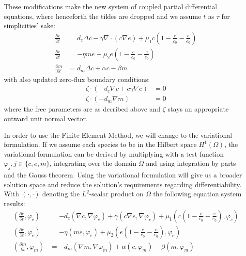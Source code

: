 These modifications make the new system of coupled partial differential equations, where henceforth the tildes are dropped and we assume $t$ as $\tau$ for simplicities' sake:
\begin{align}
	\frac{\partial c}{\partial t} &= d_c \Delta c - \gamma \nabla \cdot (c\nabla e)  + \mu_1 c\left(1-\frac{c}{c_0}-\frac{e}{e_0}\right)\label{eq:6}\\
	\frac{\partial e}{\partial t} &= -\eta m e  + \mu_2 e\left(1-\frac{c}{c_0}-\frac{e}{e_0}\right)\label{eq:7}\\
	\frac{\partial m}{\partial t} &= d_m \Delta c + \alpha c - \beta m\label{eq:8}
\end{align}
with also updated zero-flux boundary conditions:
\begin{align}
	\zeta \cdot (-d_c \nabla c + c \gamma \nabla e) &= 0\label{eq:9}\\
	\zeta \cdot (-d_m\nabla m ) &= 0\label{eq:10}
\end{align}
where the free parameters are as decribed above and $\zeta$ stays an appropriate outward unit normal vector.
 
In order to use the Finite Element Method, we will change to the variational formulation. If we assume each species to be in the Hilbert space $H^1(\Omega)$, the variational formulation can be derived by multiplying with a test function $\varphi_j, j\in \{c,e,m\}$, integrating over the domain $\Omega$ and using integration by parts and the Gauss theorem. Using the variational formulation will give us a broader solution space and reduce the solution's requirements regarding differentiability. With $\left(\cdot, \cdot\right)$ denoting the $L^2$-scalar product on $\Omega$ the following equation system results:
\begin{align}
    \left(\frac{\partial c}{\partial t}, \varphi_c\right) &=
        - d_c\left(\nabla c, \nabla \varphi_c\right) + \gamma \left(c\nabla e, \nabla \varphi_c\right) + \mu_1 \left(c \left(1-\frac{c}{c_0} - \frac{e}{e_0}\right), \varphi_c\right) \label{eq:11}\\
    \left(\frac{\partial e}{\partial t}, \varphi_e\right) &=  -\eta \left( me, \varphi_e\right) + \mu_2 \left(e\left(1-\frac{c}{c_0}-\frac{e}{e_0}\right),\varphi_e\right) \label{eq:12}\\
    \left(\frac{\partial m}{\partial t}, \varphi_m\right) &= -d_m \left(\nabla m,\nabla \varphi_m\right) + \alpha \left(c,\varphi_m\right) - \beta \left(m,\varphi_m\right) \label{eq:13}
\end{align}

